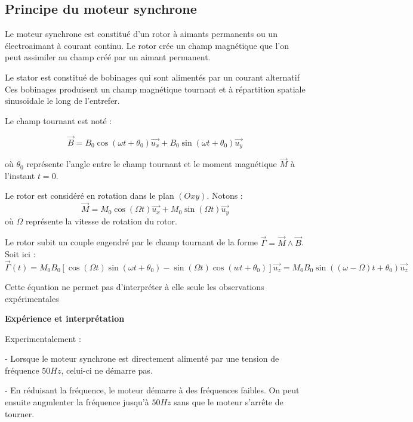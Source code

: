 \documentclass[12pt,prb,aps,epsf]{article}
\begin{document}
\subsection{Principe du moteur synchrone}

Le moteur synchrone est constitué d'un rotor à aimants permanents ou un électroaimant à courant continu. Le rotor crée un champ magnétique que l'on peut assimiler au champ créé par un aimant permanent.\medskip

Le stator est constitué de bobinages qui sont alimentés par un courant alternatif Ces bobinages produisent un champ magnétique tournant et à répartition spatiale sinusoïdale le long de l'entrefer.\medskip

Le champ tournant est noté :

\begin{equation}
    \vec{B} = B_0 \cos(\omega t + \theta_0)\vec{u_x} + B_0 \sin(\omega t + \theta_0)\vec{u_y}
\end{equation}

où $\theta_0$ représente l'angle entre le champ tournant et le moment magnétique $\vec{M}$ à l'instant $t=0$.\medskip

Le rotor est considéré en rotation dans le plan $(Oxy)$. Notons :
\begin{equation}
    \vec{M} = M_0 \cos(\Omega t) \vec{u_x} + M_0\sin(\Omega t )\vec{u_y}
\end{equation}
où $\Omega$ représente la vitesse de rotation du rotor.\medskip

Le rotor subit un couple engendré par le champ tournant de la forme $\vec{\Gamma} = \vec{M} \land \vec{B}$. Soit ici :
\begin{equation}
    \vec{\Gamma} (t) = M_0 B_0 [\cos(\Omega t)\sin(\omega t + \theta_0) - \sin(\Omega t)\cos(wt+\theta_0)] \vec{u_z} = M_0 B_0 \sin ((\omega - \Omega)t + \theta_0) \vec{u_z}
\end{equation}

Cette équation ne permet pas d'interpréter à elle seule les observations expérimentales

\textbf{Expérience et interprétation}\medskip

Experimentalement :\medskip

- Lorsque le moteur synchrone est directement alimenté par une tension de fréquence $50 Hz$, celui-ci ne démarre pas.\medskip

- En réduisant la fréquence, le moteur démarre à des fréquences faibles. On peut ensuite augmlenter la fréquence jusqu'à $50 Hz$ sans que le moteur s'arrête de tourner.\medskip
\end{document}
